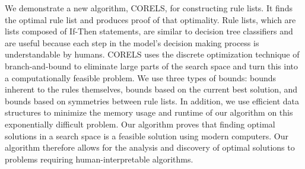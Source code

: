 
We demonstrate a new algorithm, CORELS, for constructing rule lists. It finds the optimal rule list and produces proof of that optimality. Rule lists, which are lists composed of If-Then statements, are similar to decision tree classifiers and are useful because each step in the model's decision making process is understandable by humans. CORELS uses the discrete optimization technique of branch-and-bound to eliminate large parts of the search space and turn this into a computationally feasible problem. We use three types of bounds: bounds inherent to the rules themselves, bounds based on the current best solution, and bounds based on symmetries between rule lists. In addition, we use efficient data structures to minimize the memory usage and runtime of our algorithm on this exponentially difficult problem. Our algorithm proves that finding optimal solutions in a search space is a feasible solution using modern computers. Our algorithm therefore allows for the analysis and discovery of optimal solutions to problems requiring human-interpretable algorithms.